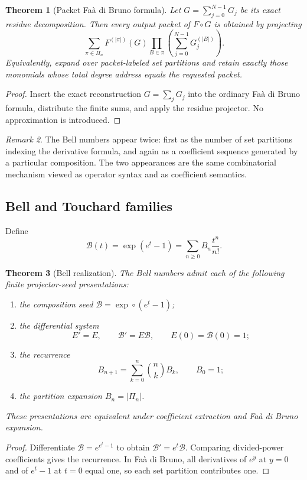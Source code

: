 \documentclass[11pt]{article}
\newtheorem{theorem}{Theorem}[section]\newtheorem{proposition}[theorem]{Proposition}\newtheorem{lemma}[theorem]{Lemma}\newtheorem{corollary}[theorem]{Corollary}
\theoremstyle{definition}\newtheorem{definition}[theorem]{Definition}\newtheorem{example}[theorem]{Example}\newtheorem{construction}[theorem]{Construction}\newtheorem{algorithm}[theorem]{Algorithm}\newtheorem{conjecture}[theorem]{Conjecture}\newtheorem{problem}[theorem]{Problem}
\theoremstyle{remark}\newtheorem{remark}[theorem]{Remark}\newtheorem{boundary}[theorem]{Boundary}\newtheorem{certificate}[theorem]{Computational Certificate}\newtheorem{classical}[theorem]{Classical Input}\newtheorem{principle}[theorem]{Structural Principle}
\begin{document}
\begin{theorem}[Packet Fa\`a di Bruno formula]
Let $G=\sum_{j=0}^{N-1}G_j$ be its exact residue decomposition.  Then every output packet of $F\circ G$ is obtained by projecting
\[
 \boxed{
 \sum_{\pi\in\Pi_n}
 F^{(|\pi|)}(G)
 \prod_{B\in\pi}
 \left(\sum_{j=0}^{N-1}G_j^{(|B|)}\right).
 }
\]
Equivalently, expand over packet-labeled set partitions and retain exactly those monomials whose total degree address equals the requested packet.
\end{theorem}
\begin{proof}
Insert the exact reconstruction $G=\sum_jG_j$ into the ordinary Fa\`a di Bruno formula, distribute the finite sums, and apply the residue projector.  No approximation is introduced.
\end{proof}

\begin{remark}
The Bell numbers appear twice: first as the number of set partitions indexing the derivative formula, and again as a coefficient sequence generated by a particular composition.  The two appearances are the same combinatorial mechanism viewed as operator syntax and as coefficient semantics.
\end{remark}

\subsection{Bell and Touchard families}
Define
\[
 \mathcal B(t)=\exp(e^t-1)=\sum_{n\geq0}B_n\frac{t^n}{n!}.
\]

\begin{theorem}[Bell realization]
The Bell numbers admit each of the following finite projector-seed presentations:
\begin{enumerate}[label=\textup{(\roman*)}]
\item the composition seed $\mathcal B=\exp\circ(e^t-1)$;
\item the differential system
\[
 E'=E,\qquad \mathcal B'=E\mathcal B,
 \qquad E(0)=\mathcal B(0)=1;
\]
\item the recurrence
\[
 \boxed{B_{n+1}=\sum_{k=0}^{n}\binom nk B_k,\qquad B_0=1;}
\]
\item the partition expansion $B_n=|\Pi_n|$.
\end{enumerate}
These presentations are equivalent under coefficient extraction and Fa\`a di Bruno expansion.
\end{theorem}
\begin{proof}
Differentiate $\mathcal B=e^{e^t-1}$ to obtain $\mathcal B'=e^t\mathcal B$.  Comparing divided-power coefficients gives the recurrence.  In Fa\`a di Bruno, all derivatives of $e^y$ at $y=0$ and of $e^t-1$ at $t=0$ equal one, so each set partition contributes one.
\end{proof}
\end{document}
